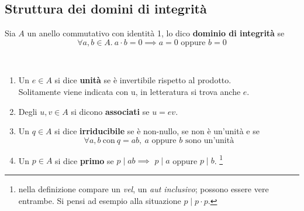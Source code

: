 \subsection{Struttura dei domini di integrità}
\begin{definizione} 
	Sia $A$ un anello commutativo con identità 1, lo dico \textbf{dominio di integrità} se 
	\begin{equation*}
	\forall a,b \in A. \ a \cdot b = 0 \implies a=0 \text{ oppure } b=0
	\end{equation*}
\end{definizione}
\begin{definizione}
	\
	\begin{enumerate}
		\item Un $e \in A$ si dice \textbf{unità} se è invertibile rispetto al prodotto. \\ Solitamente viene indicata con u, in letteratura si trova anche $e$.
		\item Degli $u,v \in A$ si dicono \textbf{associati} se $u=ev$.
		\item Un $q \in A$ si dice \textbf{irriducibile} se è non-nullo, se non è un'unità e se 
		\begin{equation*}
		\forall a,b \ \text{con} \ q=ab, \ \text{$a$ oppure $b$ sono un'unità}
		\end{equation*}
		\item Un $p \in A$ si dice \textbf{primo} se $p\mid ab \implies $ $p\mid a$ oppure $p\mid b$. \footnote{nella definizione compare un \textit{vel}, un \textit{aut inclusivo}; possono essere vere entrambe. Si pensi ad esempio alla situazione $p\mid p\cdot p$.}
	\end{enumerate}
\end{definizione}
